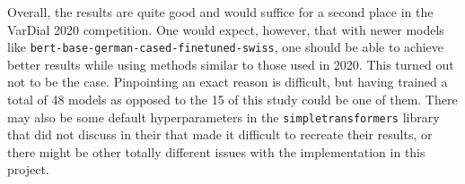 Overall, the results are quite good and would suffice for a second place in the VarDial 2020 competition. One would expect, however, that with newer models like \texttt{bert-base-german-cased-finetuned-swiss}, one should be able to achieve better results while using methods similar to those used in 2020. This turned out not to be the case. Pinpointing an exact reason is difficult, but \cite{scherrerHeLjuVarDial20202020} having trained a total of 48 models as opposed to the 15 of this study could be one of them. There may also be some default hyperparameters in the \texttt{simpletransformers} library that \cite{scherrerHeLjuVarDial20202020} did not discuss in their that made it difficult to recreate their results, or there might be other totally different issues with the implementation in this project.
